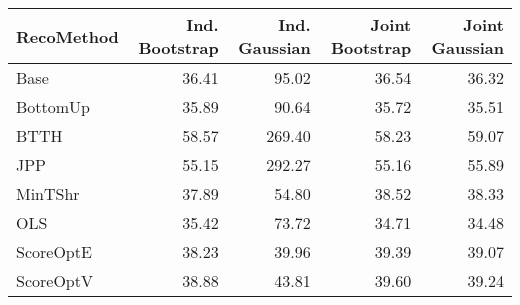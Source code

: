 
\begin{tabular}{l|r|r|r|r}
\hline
RecoMethod & Ind. Bootstrap & Ind. Gaussian & Joint Bootstrap & Joint Gaussian\\
\hline
Base & 36.41 & 95.02 & 36.54 & 36.32\\
\hline
BottomUp & 35.89 & 90.64 & 35.72 & 35.51\\
\hline
BTTH & 58.57 & 269.40 & 58.23 & 59.07\\
\hline
JPP & 55.15 & 292.27 & 55.16 & 55.89\\
\hline
MinTShr & 37.89 & 54.80 & 38.52 & 38.33\\
\hline
OLS & 35.42 & 73.72 & 34.71 & 34.48\\
\hline
ScoreOptE & 38.23 & 39.96 & 39.39 & 39.07\\
\hline
ScoreOptV & 38.88 & 43.81 & 39.60 & 39.24\\
\hline
\end{tabular}
